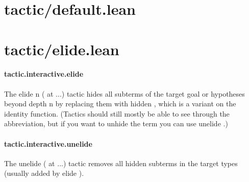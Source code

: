 \documentclass{article}
\begin{document}
\section{tactic/default.lean}\section{tactic/elide.lean}\paragraph{tactic.interactive.elide}
\par
The 
\colorbox[RGB]{253,246,227}{{{{\color[RGB]{101, 123, 131} elide n ( }}}{{{\color[RGB]{133, 153, 0} at }}}{{{\color[RGB]{101, 123, 131}  ...) }}}} tactic hides all subterms of the target goal or hypotheses
beyond depth 
\colorbox[RGB]{253,246,227}{{{{\color[RGB]{101, 123, 131} n }}}} by replacing them with 
\colorbox[RGB]{253,246,227}{{{{\color[RGB]{101, 123, 131} hidden }}}}, which is a variant
on the identity function. (Tactics should still mostly be able to see
through the abbreviation, but if you want to unhide the term you can use
\colorbox[RGB]{253,246,227}{{{{\color[RGB]{101, 123, 131} unelide }}}}.)
\paragraph{tactic.interactive.unelide}
\par
The 
\colorbox[RGB]{253,246,227}{{{{\color[RGB]{101, 123, 131} unelide ( }}}{{{\color[RGB]{133, 153, 0} at }}}{{{\color[RGB]{101, 123, 131}  ...) }}}} tactic removes all 
\colorbox[RGB]{253,246,227}{{{{\color[RGB]{101, 123, 131} hidden }}}} subterms in the target
types (usually added by 
\colorbox[RGB]{253,246,227}{{{{\color[RGB]{101, 123, 131} elide }}}}).
\end{document}
